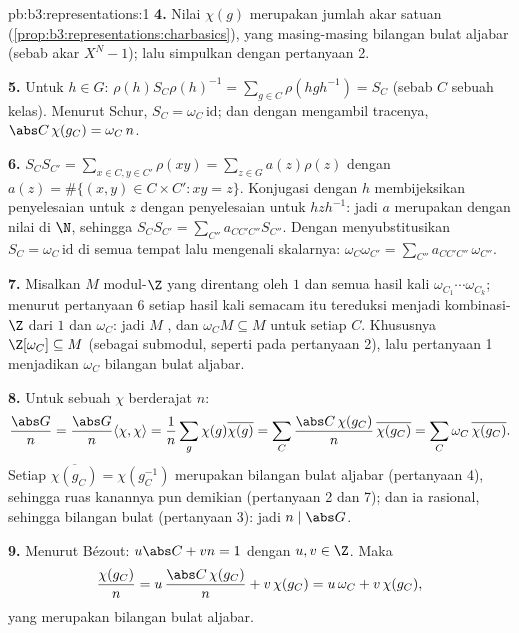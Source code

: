 \begin{solution}{pb:b3:representations:1}
\textbf{4.} Nilai $\chi(g)$ merupakan jumlah akar satuan
(\cref{prop:b3:representations:charbasics}), yang masing-masing bilangan bulat
aljabar (sebab akar $X^N - 1$); lalu simpulkan dengan pertanyaan 2.

\textbf{5.} Untuk $h \in G$: $\rho(h)S_C\rho(h)^{-1} = \sum_{g\in
C}\rho(hgh^{-1}) = S_C$ (sebab $C$ sebuah kelas). Menurut Schur, $S_C =
\omega_C\,\mathrm{id}$; dan dengan mengambil tracenya, $\abs C\,\chi(g_C) =
\omega_C\, n$.

\textbf{6.} $S_CS_{C'} = \sum_{x \in C, y \in C'}\rho(xy) =
\sum_{z \in G} a(z)\rho(z)$ dengan $a(z) = \#\{(x,y) \in C\times
C' : xy = z\}$. Konjugasi dengan $h$ membijeksikan penyelesaian untuk
$z$ dengan penyelesaian untuk $hzh^{-1}$: jadi $a$ merupakan  dengan
nilai di $\N$, sehingga $S_CS_{C'} = \sum_{C''}a_{CC'C''}S_{C''}$.
Dengan menyubstitusikan $S_C = \omega_C\,\mathrm{id}$ di semua tempat lalu
mengenali skalarnya:
$\omega_C\omega_{C'} = \sum_{C''}a_{CC'C''}\,\omega_{C''}$.

\textbf{7.} Misalkan $M$ modul-$\Z$ yang direntang oleh $1$ dan semua
hasil kali $\omega_{C_1}\cdots\omega_{C_k}$; menurut pertanyaan 6 setiap
hasil kali semacam itu tereduksi menjadi kombinasi-$\Z$ dari $1$ dan
$\omega_C$: jadi $M$ , dan $\omega_C M
\subseteq M$ untuk setiap $C$. Khususnya $\Z[\omega_C]
\subseteq M$  (sebagai submodul, seperti pada pertanyaan
2), lalu pertanyaan 1 menjadikan $\omega_C$ bilangan bulat aljabar.

\textbf{8.} Untuk sebuah $\chi$  berderajat $n$:
\[
\frac{\abs G}{n} = \frac{\abs G}{n}\langle\chi,\chi\rangle
= \frac1n \sum_{g}\chi(g)\overline{\chi(g)}
= \sum_{C}\frac{\abs C\,\chi(g_C)}{n}\,\overline{\chi(g_C)}
= \sum_C \omega_C\,\overline{\chi(g_C)} .
\]
Setiap $\overline{\chi(g_C)} = \chi(g_C^{-1})$ merupakan bilangan bulat
aljabar (pertanyaan 4), sehingga ruas kanannya pun demikian (pertanyaan 2 dan
7); dan ia rasional, sehingga bilangan bulat (pertanyaan 3): jadi $n \mid \abs
G$.

\textbf{9.} Menurut Bézout: $u\abs C + vn = 1$ dengan $u, v \in \Z$.
Maka
\[
\frac{\chi(g_C)}{n} = u\,\frac{\abs C\,\chi(g_C)}{n} +
v\,\chi(g_C) = u\,\omega_C + v\,\chi(g_C),
\]
yang merupakan bilangan bulat aljabar.


\end{solution}
